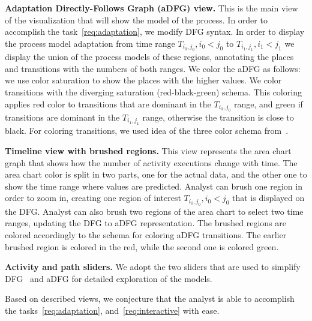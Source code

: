 \textbf{Adaptation Directly-Follows Graph (aDFG) view.} This is the main view of the visualization that will show the model of the process. In order to accomplish the task~\ref{req:adaptation}, we modify DFG syntax. In order to display the process model adaptation from time range $T_{i_0,j_0}, i_0<j_0$ to $T_{i_1,j_1}, i_1<j_1$ we display the union of the process models of these regions, annotating the places and transitions with the numbers of both ranges. We color the aDFG as follows: we use color saturation to show the places with the higher values. We color transitions with the diverging saturation (red-black-green) schema. This coloring applies red color to transitions that are dominant in the $T_{i_0,j_0}$ range, and green if transitions are dominant in the $T_{i_1,j_1}$ range, otherwise the transition is close to black. For coloring transitions, we used idea of the three color schema from~\cite{DBLP:conf/grapp/KriglsteinR12}.

\textbf{Timeline view with brushed regions.} This view represents the area chart graph that shows how the number of activity executions change with time. The area chart color is split in two parts, one for the actual data, and the other one to show the time range where values are predicted. Analyst can brush one region in order to zoom in, creating one region of interest $T_{i_0,j_0}, i_0<j_0$ that is displayed on the DFG. Analyst can also brush two regions of the area chart to select two time ranges, updating the DFG to aDFG representation. The brushed regions are colored accordingly to the schema for coloring aDFG transitions. The earlier brushed region is colored in the red, while the second one is colored green. 

\textbf{Activity and path sliders.} We adopt the two sliders that are used to simplify DFG~\cite{leemans2019directly} and aDFG for detailed exploration of the models.

Based on described views, we conjecture that the analyst is able to accomplish the tasks~\ref{req:adaptation}, and~\ref{req:interactive} with ease.







